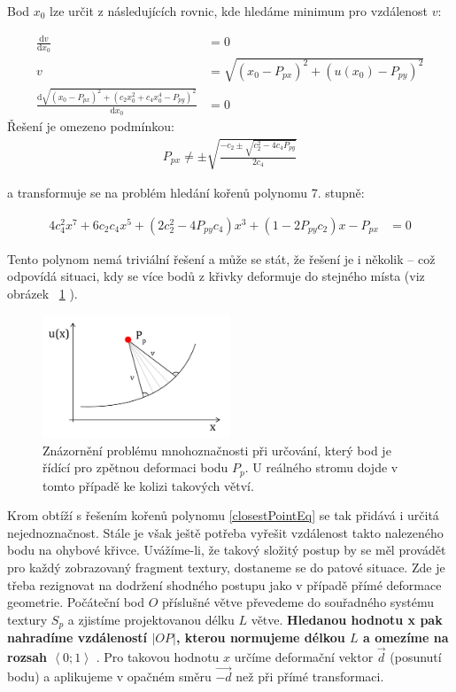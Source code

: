Bod $x_0$ lze určit z následujících rovnic, kde hledáme minimum pro vzdálenost $v$:

\begin{align}
\frac{\mathrm {d}{v}}{\mathrm {d}{x_0}} &= 0 \nonumber\\
v &= \sqrt{(x_0 - P_{px})^2 + (u(x_0) - P_{py})^2} \nonumber\\
\frac{\mathrm {d} \sqrt{(x_0 - P_{px})^2 + (c_2x_0^2 +c_4x_0^4 - P_{py})^2}}{\mathrm{d}x_0} &=0
\end{align}
Řešení je omezeno podmínkou:
\begin{align}
P_{px} \neq \pm \sqrt {\frac{-c_2 \pm \sqrt{c_2^2 - 4c_4P_{py}}}{2c_4}}
\end{align}

a transformuje se na problém hledání kořenů polynomu 7. stupně:

\begin{align}
\label{closestPointEq}
4c_4^2 x^7 + 6c_2c_4x^5 + (2c_2^2 - 4P_{py}c_4)x^3 + (1-2P_{py}c_2)x - P_{px} &= 0
\end{align}

Tento polynom nemá triviální řešení a může se stát, že řešení je i několik – což odpovídá situaci, kdy se více bodů z křivky deformuje do stejného místa (viz obrázek ~\ref{fig:multisolution} ).
\begin{figure}[!hbt]
\begin{center}
\includegraphics[width=0.5\textwidth]{./figures/revDef_multisolution.png}
\caption[Mnohoznačnost při zpětné transformaci]
{Znázornění problému mnohoznačnosti při určování, který bod je řídící pro zpětnou deformaci bodu $P_p$. U reálného stromu dojde v tomto případě ke kolizi takových větví.\label{fig:multisolution}}
\end{center}
\end{figure}

Krom obtíží s řešením kořenů polynomu \eqref{closestPointEq} se tak přidává i určitá nejednoznačnost. Stále je však ještě potřeba vyřešit vzdálenost takto nalezeného bodu na ohybové křivce. Uvážíme-li, že takový složitý postup by se měl provádět pro každý zobrazovaný fragment textury, dostaneme se do patové situace.
Zde je třeba rezignovat na dodržení shodného postupu jako v případě přímé deformace geometrie. Počáteční bod $O$ příslušné větve převedeme do souřadného systému textury ${S_p}$ a zjistíme projektovanou délku $L$ větve. {\bf Hledanou hodnotu x pak nahradíme vzdáleností $\left| OP \right|$, kterou normujeme délkou $L $ a omezíme na rozsah $\left \langle 0;1 \right \rangle$ }. Pro takovou hodnotu $x$ určíme deformační vektor $\vec{d}$ (posunutí bodu) a aplikujeme v opačném směru $\vec{-d}$ než při přímé transformaci.
 
